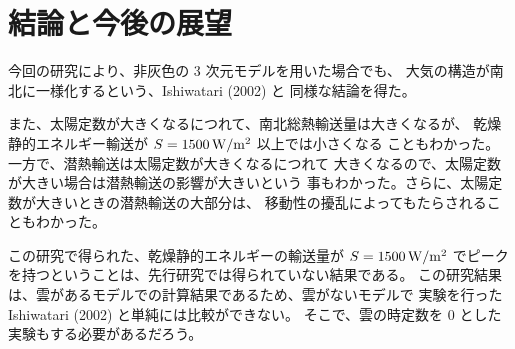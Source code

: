 \documentclass[body]{subfiles}
\begin{document}
\chapter{結論と今後の展望}

今回の研究により、非灰色の 3 次元モデルを用いた場合でも、
大気の構造が南北に一様化するという、Ishiwatari \etal (2002) と
同様な結論を得た。

また、太陽定数が大きくなるにつれて、南北総熱輸送量は大きくなるが、
乾燥静的エネルギー輸送が \(S=1500\hmu{W/m^2}\) 以上では小さくなる
こともわかった。一方で、潜熱輸送は太陽定数が大きくなるにつれて
大きくなるので、太陽定数が大きい場合は潜熱輸送の影響が大きいという
事もわかった。さらに、太陽定数が大きいときの潜熱輸送の大部分は、
移動性の擾乱によってもたらされることもわかった。

この研究で得られた、乾燥静的エネルギーの輸送量が \(S=1500\hmu{W/m^2}\)
でピークを持つということは、先行研究では得られていない結果である。
この研究結果は、雲があるモデルでの計算結果であるため、雲がないモデルで
実験を行った Ishiwatari \etal (2002) と単純には比較ができない。
そこで、雲の時定数を 0 とした実験もする必要があるだろう。
\end{document}
